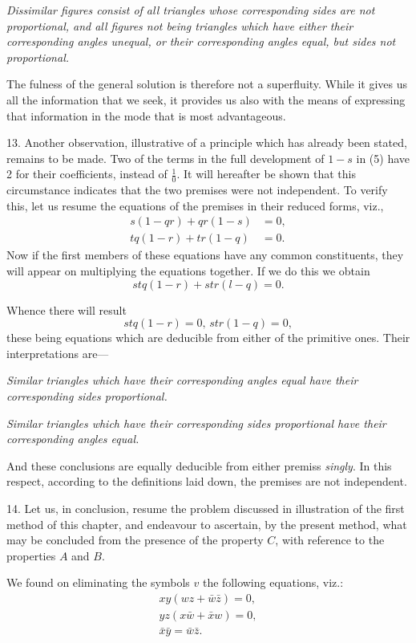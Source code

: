 \documentclass[oneside]{book}
\begin{document}
\textit{Dissimilar figures consist of all triangles whose corresponding
sides are not proportional, and all figures not being triangles which
have either their corresponding angles unequal, or their corresponding
angles equal, but sides not proportional.}

The fulness of the general solution is therefore not a superfluity.
While it gives us all the information that we seek, it
provides us also with the means of expressing that information
in the mode that is most advantageous.

13. Another observation, illustrative of a principle which has
already been stated, remains to be made. Two of the terms in
the full development of $1 - s$ in (5) have 2 for their coefficients,
instead of $\frac{1}{0}$. It will hereafter be shown that this circumstance
indicates that the two premises were not independent. To verify
this, let us resume the equations of the premises in their reduced
forms, viz.,
\begin{eqnarray*}
s(1-qr)+qr(1-s) &= 0,\\
tq(1-r)+tr(1-q) &= 0.
\end{eqnarray*}
Now if the first members of these equations have any common
constituents, they will appear on multiplying the equations together.
If we do this we obtain
\[
stq(1 - r) + str(l - q) = 0.
\]

Whence there will result
\[
stq (1 - r) = 0\textrm{, }str (1 - q) = 0,
\]
these being equations which are deducible from either of the
primitive ones. Their interpretations are---

\textit{Similar triangles which have their corresponding angles equal
have their corresponding sides proportional.}

\textit{Similar triangles which have their corresponding sides proportional
have their corresponding angles equal. }

And these conclusions are equally deducible from either premiss \textit{singly}. In this respect, according to the definitions laid
down, the premises are not independent.

14. Let us, in conclusion, resume the problem discussed in
illustration of the first method of this chapter, and endeavour to
ascertain, by the present method, what may be concluded from
the presence of the property $C$, with reference to the properties
$A$ and $B$.

We found on eliminating the symbols $v$ the following equations,
viz.:
\setcounter{equation}{0}
\begin{eqnarray}
xy(wz + \bar{w}\bar{z}) = 0, \\
yz (x\bar{w} + \bar{x}w) = 0,\\
\bar{x}\bar{y} = \bar{w}\bar{z}.
\end{eqnarray}
\end{document}
